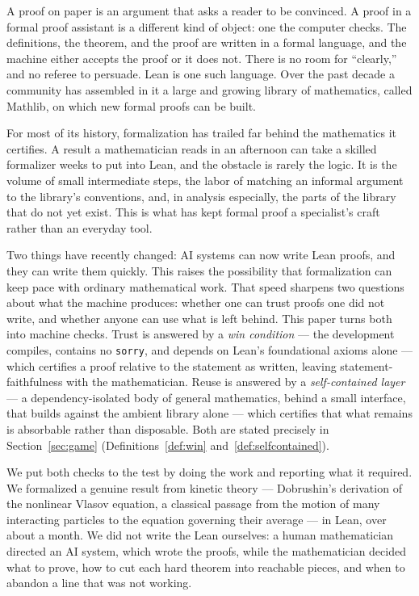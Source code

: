 \documentclass[11pt]{article}
\theoremstyle{plain}
\theoremstyle{definition}
\theoremstyle{remark}
\newcommand{\lean}[1]{\texttt{#1}}
\begin{document}
A proof on paper is an argument that asks a reader to be convinced. A proof in a
formal proof assistant is a different kind of object: one the computer checks. The
definitions, the theorem, and the proof are written in a formal language, and the
machine either accepts the proof or it does not. There is no room for ``clearly,''
and no referee to persuade. Lean is one such language. Over the past decade a
community has assembled in it a large and growing library of mathematics, called
Mathlib, on which new formal proofs can be built.

For most of its history, formalization has trailed far behind the mathematics it
certifies. A result a mathematician reads in an afternoon can take a skilled
formalizer weeks to put into Lean, and the obstacle is rarely the logic. It is the
volume of small intermediate steps, the labor of matching an informal argument to
the library's conventions, and, in analysis especially, the parts of the library
that do not yet exist. This is what has kept formal proof a specialist's craft
rather than an everyday tool.

Two things have recently changed: AI systems can now write Lean proofs, and they
can write them quickly. This raises the possibility that formalization can
keep pace with ordinary mathematical work. That speed sharpens two questions about what the machine produces: whether one can
trust proofs one did not write, and whether anyone can use what is left behind. This
paper turns both into machine checks. Trust is answered by a \emph{win condition} --- the
development compiles, contains no \lean{sorry}, and depends on Lean's foundational
axioms alone --- which certifies a proof relative to the statement as written, leaving
statement-faithfulness with the mathematician. Reuse is answered by a
\emph{self-contained layer} --- a dependency-isolated body of general mathematics,
behind a small interface, that builds against the ambient library alone --- which
certifies that what remains is absorbable rather than disposable. Both are stated
precisely in Section~\ref{sec:game} (Definitions~\ref{def:win}
and~\ref{def:selfcontained}).

We put both checks to the test by doing the work and reporting what it required. We
formalized a genuine result from kinetic theory --- Dobrushin's derivation of the nonlinear
Vlasov equation, a classical passage from the motion of many interacting particles to
the equation governing their average --- in Lean, over about a month. We did not write the Lean
ourselves: a human mathematician directed an AI system, which wrote the proofs, while
the mathematician decided what to prove, how to cut each hard theorem into reachable
pieces, and when to abandon a line that was not working.
\end{document}
